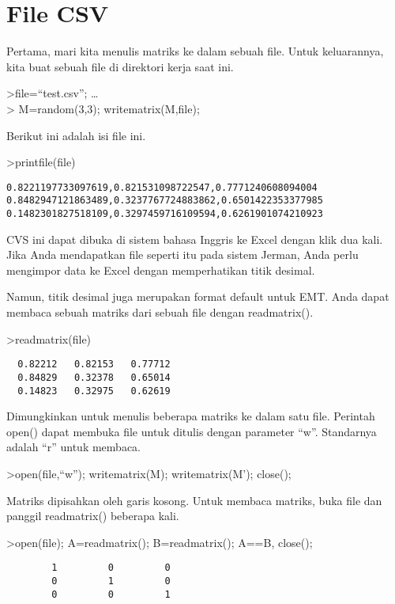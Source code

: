 \documentclass[
]{book}
\begin{document}
\chapter{File CSV}\label{file-csv}

Pertama, mari kita menulis matriks ke dalam sebuah file. Untuk keluarannya, kita buat sebuah file di direktori kerja saat ini.

\textgreater file=``test.csv''; \ldots{}\\
\textgreater{} M=random(3,3); writematrix(M,file);

Berikut ini adalah isi file ini.

\textgreater printfile(file)

\begin{verbatim}
0.8221197733097619,0.821531098722547,0.7771240608094004
0.8482947121863489,0.3237767724883862,0.6501422353377985
0.1482301827518109,0.3297459716109594,0.6261901074210923
\end{verbatim}

CVS ini dapat dibuka di sistem bahasa Inggris ke Excel dengan klik dua kali. Jika Anda mendapatkan file seperti itu pada sistem Jerman, Anda perlu mengimpor data ke Excel dengan memperhatikan titik desimal.

Namun, titik desimal juga merupakan format default untuk EMT. Anda dapat membaca sebuah matriks dari sebuah file dengan readmatrix().

\textgreater readmatrix(file)

\begin{verbatim}
  0.82212   0.82153   0.77712 
  0.84829   0.32378   0.65014 
  0.14823   0.32975   0.62619 
\end{verbatim}

Dimungkinkan untuk menulis beberapa matriks ke dalam satu file. Perintah open() dapat membuka file untuk ditulis dengan parameter ``w''. Standarnya adalah ``r'' untuk membaca.

\textgreater open(file,``w''); writematrix(M); writematrix(M'); close();

Matriks dipisahkan oleh garis kosong. Untuk membaca matriks, buka file dan panggil readmatrix() beberapa kali.

\textgreater open(file); A=readmatrix(); B=readmatrix(); A==B, close();

\begin{verbatim}
        1         0         0 
        0         1         0 
        0         0         1 
\end{verbatim}
\end{document}
